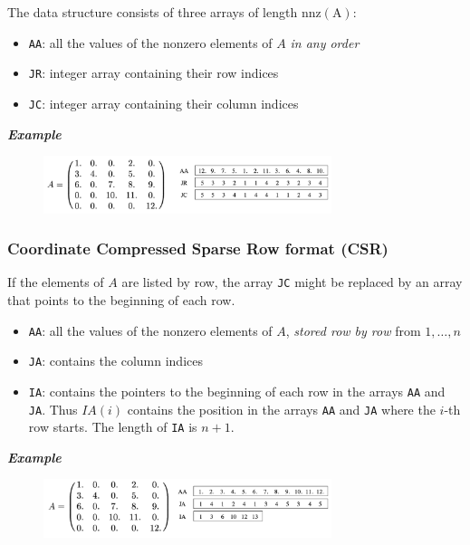 The data structure consists of three arrays of length $\mathrm{nnz(A)}$:

\begin{itemize}
    \item \texttt{AA}:  all the values of the nonzero elements of $A$ \textit{in any order}
    \item \texttt{JR}: integer array containing their row indices
    \item \texttt{JC}: integer array containing their column indices
\end{itemize}

\textbf{\textit{Example}}

\begin{figure}[h]
    \centering
    \includegraphics[width=0.75\textwidth]{images/example-coo.png}
\end{figure}

\subsubsection{Coordinate Compressed Sparse Row format (CSR)}

If the elements of $A$ are listed by row, the array \texttt{JC} might be replaced by an array that points to the beginning of each row.
\begin{itemize}
    \item \texttt{AA}: all the values of the nonzero elements of $A$, \textit{stored row by row} from $1, \dots, n$
    \item \texttt{JA}: contains the column indices
    \item \texttt{IA}: contains the pointers to the beginning of each row in the arrays \texttt{AA} and \texttt{JA}. Thus $IA(i)$ contains the position in the arrays \texttt{AA} and \texttt{JA} where the $i$-th row starts. The length of \texttt{IA} is $n + 1$.
\end{itemize}

\textbf{\textit{Example}}

\begin{figure}[h]
    \centering
    \includegraphics[width=0.75\textwidth]{images/example-csr.png}
\end{figure}
